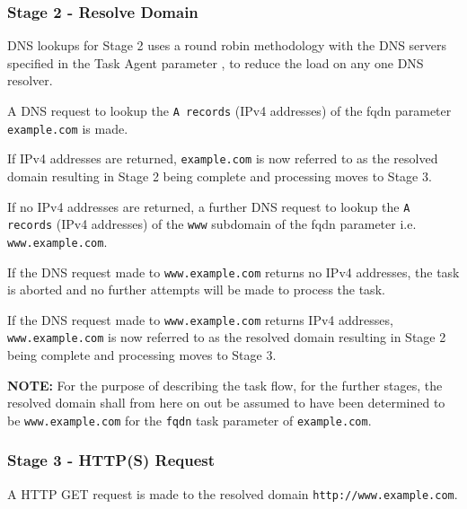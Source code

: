 \documentclass{mscreport}
\begin{document}
\subsubsection{Stage 2 - Resolve Domain}
\label{subsubsection:task_flow_stage_2}

DNS lookups for Stage 2 uses a round robin methodology with the DNS servers specified in the Task Agent parameter \texttt{}, to reduce the load on any one DNS resolver.

\vspace{0.3cm} \noindent
A DNS request to lookup the \texttt{A records} (IPv4 addresses) of the fqdn parameter \texttt{example.com} is made.

\vspace{0.3cm} \noindent
If IPv4 addresses are returned, \texttt{example.com} is now referred to as the resolved domain resulting in Stage 2 being complete and processing moves to Stage 3.

\vspace{0.3cm} \noindent
If no IPv4 addresses are returned, a further DNS request to lookup the \texttt{A records} (IPv4 addresses) of the \texttt{www} subdomain of the fqdn parameter i.e. \texttt{www.example.com}.

\vspace{0.3cm} \noindent
If the DNS request made to \texttt{www.example.com} returns no IPv4 addresses, the task is aborted and no further attempts will be made to process the task.

\vspace{0.3cm} \noindent
If the DNS request made to \texttt{www.example.com} returns IPv4 addresses, \texttt{www.example.com} is now referred to as the resolved domain resulting in Stage 2 being complete and processing moves to Stage 3.

\vspace{0.3cm} \noindent
\textbf{NOTE:} For the purpose of describing the task flow, for the further stages, the resolved domain shall from here on out be assumed to have been determined to be \texttt{www.example.com} for the \texttt{fqdn} task parameter of \texttt{example.com}.

\subsubsection{Stage 3 - HTTP(S) Request}
\label{subsubsec:task_flow_stg_3}

A HTTP GET request is made to the resolved domain \texttt{http://www.example.com}.
\end{document}
